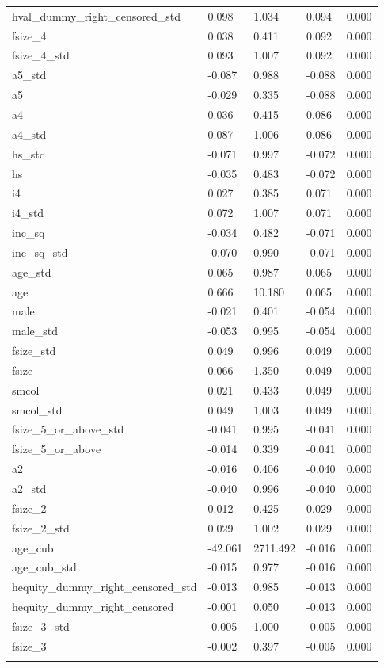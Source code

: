 \documentclass[12pt,a4paper]{article}
\begin{document}
\begin{singlespace}
\begin{ThreePartTable}
\begin{longtable}{l C{2cm} C{2cm} C{2cm} C{2cm} }
  hval\_dummy\_right\_censored\_std & 0.098 & 1.034 & 0.094 & 0.000 \\ 
  fsize\_4 & 0.038 & 0.411 & 0.092 & 0.000 \\ 
  fsize\_4\_std & 0.093 & 1.007 & 0.092 & 0.000 \\ 
  a5\_std & -0.087 & 0.988 & -0.088 & 0.000 \\ 
  a5 & -0.029 & 0.335 & -0.088 & 0.000 \\ 
  a4 & 0.036 & 0.415 & 0.086 & 0.000 \\ 
  a4\_std & 0.087 & 1.006 & 0.086 & 0.000 \\ 
  hs\_std & -0.071 & 0.997 & -0.072 & 0.000 \\ 
  hs & -0.035 & 0.483 & -0.072 & 0.000 \\ 
  i4 & 0.027 & 0.385 & 0.071 & 0.000 \\ 
  i4\_std & 0.072 & 1.007 & 0.071 & 0.000 \\ 
  inc\_sq & -0.034 & 0.482 & -0.071 & 0.000 \\ 
  inc\_sq\_std & -0.070 & 0.990 & -0.071 & 0.000 \\ 
  age\_std & 0.065 & 0.987 & 0.065 & 0.000 \\ 
  age & 0.666 & 10.180 & 0.065 & 0.000 \\ 
  male & -0.021 & 0.401 & -0.054 & 0.000 \\ 
  male\_std & -0.053 & 0.995 & -0.054 & 0.000 \\ 
  fsize\_std & 0.049 & 0.996 & 0.049 & 0.000 \\ 
  fsize & 0.066 & 1.350 & 0.049 & 0.000 \\ 
  smcol & 0.021 & 0.433 & 0.049 & 0.000 \\ 
  smcol\_std & 0.049 & 1.003 & 0.049 & 0.000 \\ 
  fsize\_5\_or\_above\_std & -0.041 & 0.995 & -0.041 & 0.000 \\ 
  fsize\_5\_or\_above & -0.014 & 0.339 & -0.041 & 0.000 \\ 
  a2 & -0.016 & 0.406 & -0.040 & 0.000 \\ 
  a2\_std & -0.040 & 0.996 & -0.040 & 0.000 \\ 
  fsize\_2 & 0.012 & 0.425 & 0.029 & 0.000 \\ 
  fsize\_2\_std & 0.029 & 1.002 & 0.029 & 0.000 \\ 
  age\_cub & -42.061 & 2711.492 & -0.016 & 0.000 \\ 
  age\_cub\_std & -0.015 & 0.977 & -0.016 & 0.000 \\ 
  hequity\_dummy\_right\_censored\_std & -0.013 & 0.985 & -0.013 & 0.000 \\ 
  hequity\_dummy\_right\_censored & -0.001 & 0.050 & -0.013 & 0.000 \\ 
  fsize\_3\_std & -0.005 & 1.000 & -0.005 & 0.000 \\ 
  fsize\_3 & -0.002 & 0.397 & -0.005 & 0.000 \\ 
					\bottomrule
				\insertTableNotes \\
				\end{longtable} 


\end{ThreePartTable}
\end{singlespace}
\end{document}
